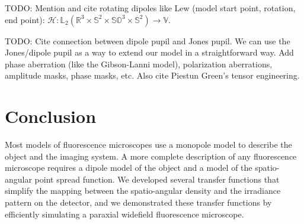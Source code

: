 \documentclass[]{osa-article}
\providecommand{\mc}[1]{\mathcal{#1}}
\providecommand{\mbb}[1]{\mathbb{#1}}
\begin{document}
TODO: Mention and cite rotating dipoles like Lew (model start point, rotation, end point):
$\mc{H}: \mbb{L}_2(\mbb{R}^3\times\mbb{S}^2\times\mbb{SO}^3\times\mbb{S}^2) \rightarrow \mbb{V}$. 


TODO: Cite connection between dipole pupil and Jones pupil. We can use the
Jones/dipole pupil as a way to extend our model in a straightforward way. Add
phase aberration (like the Gibson-Lanni model), polarization aberrations,
amplitude masks, phase masks, etc. Also cite Piestun Green's tensor engineering.



\section{Conclusion}
Most models of fluorescence microscopes use a monopole model to describe the
object and the imaging system. A more complete description of any fluorescence
microscope requires a dipole model of the object and a model of the
spatio-angular point spread function. We developed several transfer functions
that simplify the mapping between the spatio-angular density and the irradiance
pattern on the detector, and we demonstrated these transfer functions by
efficiently simulating a paraxial widefield fluorescence microscope.


\appendix
\end{document}
